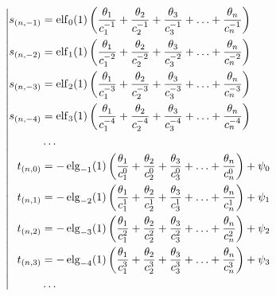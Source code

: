 %
\begin{equation*} \left| \begin{aligned}
s_{(n,-1)} &=
  \elf_0(1) \left(
  \frac{\theta_1}{c_1^{-1}}
+ \frac{\theta_2}{c_2^{-1}}
+ \frac{\theta_3}{c_3^{-1}}
+ \ldots
+ \frac{\theta_n}{c_n^{-1}} \right) \\
%
s_{(n,-2)} &=
  \elf_1(1) \left(
  \frac{\theta_1}{c_1^{-2}}
+ \frac{\theta_2}{c_2^{-2}}
+ \frac{\theta_3}{c_3^{-2}}
+ \ldots
+ \frac{\theta_n}{c_n^{-2}} \right) \\
%
s_{(n,-3)} &=
  \elf_2(1) \left(
  \frac{\theta_1}{c_1^{-3}}
+ \frac{\theta_2}{c_2^{-3}}
+ \frac{\theta_3}{c_3^{-3}}
+ \ldots
+ \frac{\theta_n}{c_n^{-3}} \right) \\
%
s_{(n,-4)} &=
  \elf_3(1) \left(
  \frac{\theta_1}{c_1^{-4}}
+ \frac{\theta_2}{c_2^{-4}}
+ \frac{\theta_3}{c_3^{-4}}
+ \ldots
+ \frac{\theta_n}{c_n^{-4}} \right) \\
%
&\ldots \\
%
t_{(n,0)} &=
- \elg_{-1}(1) \left(
  \frac{\theta_1}{c_1^0}
+ \frac{\theta_2}{c_2^0}
+ \frac{\theta_3}{c_3^0}
+ \ldots
+ \frac{\theta_n}{c_n^0} \right)
+ \psi_0 \\
%
t_{(n,1)} &=
- \elg_{-2}(1) \left(
  \frac{\theta_1}{c_1^1}
+ \frac{\theta_2}{c_2^1}
+ \frac{\theta_3}{c_3^1}
+ \ldots
+ \frac{\theta_n}{c_n^1} \right)
+ \psi_1 \\
%
t_{(n,2)} &=
- \elg_{-3}(1) \left(
  \frac{\theta_1}{c_1^2}
+ \frac{\theta_2}{c_2^2}
+ \frac{\theta_3}{c_3^2}
+ \ldots
+ \frac{\theta_n}{c_n^2} \right)
+ \psi_2 \\
%
t_{(n,3)} &=
- \elg_{-4}(1) \left(
  \frac{\theta_1}{c_1^3}
+ \frac{\theta_2}{c_2^3}
+ \frac{\theta_3}{c_3^3}
+ \ldots
+ \frac{\theta_n}{c_n^3} \right)
+ \psi_3 \\
%
&\ldots \\
\end{aligned} \right. \end{equation*}